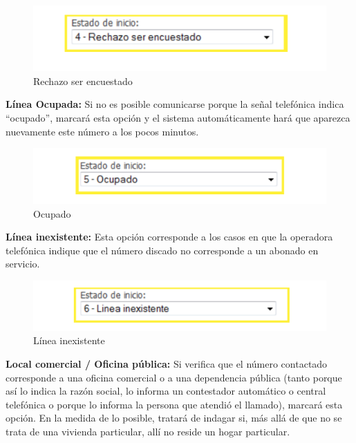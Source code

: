 \documentclass[
  openany]{book}
\begin{document}
\begin{figure}

{\centering \includegraphics[width=1\linewidth]{imagenes/figura6-42} 

}

\caption{Rechazo ser encuestado}\label{fig:rechazo1}
\end{figure}

\textbf{Línea Ocupada:} Si no es posible comunicarse porque la señal telefónica indica ``ocupado'', marcará esta opción y el sistema automáticamente hará que aparezca nuevamente este número a los pocos minutos.

\begin{figure}

{\centering \includegraphics[width=1\linewidth]{imagenes/figura6-43} 

}

\caption{Ocupado}\label{fig:ocupado1}
\end{figure}

\textbf{Línea inexistente:} Esta opción corresponde a los casos en que la operadora telefónica indique que el número discado no corresponde a un abonado en servicio.

\begin{figure}

{\centering \includegraphics[width=1\linewidth]{imagenes/figura6-44} 

}

\caption{Línea inexistente}\label{fig:Lineaine3}
\end{figure}

\textbf{Local comercial / Oficina pública:} Si verifica que el número contactado corresponde a una oficina comercial o a una dependencia pública (tanto porque así lo indica la razón social, lo informa un contestador automático o central telefónica o porque lo informa la persona que atendió el llamado), marcará esta opción. En la medida de lo posible, tratará de indagar si, más allá de que no se trata de una vivienda particular, allí no reside un hogar particular.
\end{document}
